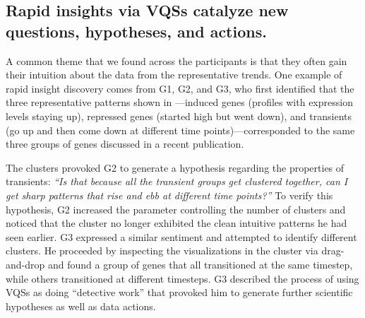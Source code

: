 \subsection{Rapid insights via VQSs catalyze new questions, hypotheses, and actions.}
\par {}
\par A common theme that we found across the \bio participants is that they often gain their intuition about the data from the representative trends. One example of rapid insight discovery comes from G1, G2, and G3, who first identified that the three representative patterns shown in \zv---induced genes (profiles with expression levels staying up), repressed genes (started high but went down), and transients (go up and then come down at different time points)---corresponded to the same three groups of genes discussed in a recent publication\cite{Gloss2017}. 
\par The clusters provoked G2 to generate a hypothesis regarding the properties of transients: \textit{``Is that because all the transient groups get clustered together, can I get sharp patterns that rise and ebb at different time points?''} To verify this hypothesis, G2 increased the parameter controlling the number of clusters and noticed that the cluster no longer exhibited the clean intuitive patterns he had seen earlier. G3 expressed a similar sentiment and attempted to identify different clusters. He proceeded by inspecting the visualizations in the cluster via drag-and-drop and found a group of genes that all transitioned at the same timestep, while others transitioned at different timesteps. G3 described the process of using VQSs as doing ``detective work'' that provoked him to generate further scientific hypotheses as well as data actions.